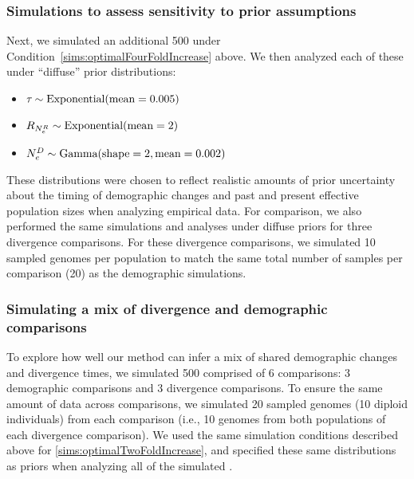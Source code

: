 \subsubsection{Simulations to assess sensitivity to prior assumptions}


Next, we simulated an additional 500 \datasets under
Condition~\ref{sims:optimalFourFoldIncrease} above.
We then analyzed each of these \datasets under ``diffuse'' prior
distributions:
\begin{itemize}
    \item $\etime \sim \dexponential{0.005}$
    \item $\rootrelativepopsize \sim \dexponential{2}$
    \item $\epopsize[\descendantpopindex{}] \sim \dgamma{2}{0.002}$
\end{itemize}
These distributions were chosen to reflect realistic amounts of prior
uncertainty about the timing of demographic changes and past and present
effective population sizes when analyzing empirical data.
For comparison, we also performed the same simulations and analyses under
diffuse priors for three divergence comparisons.
For these divergence comparisons, we simulated 10 sampled genomes per
population to match the same total number of samples per comparison (20) as the
demographic simulations.


\subsubsection{Simulating a mix of divergence and demographic comparisons}

To explore how well our method can infer a mix of shared demographic changes
and divergence times, we simulated 500 \datasets comprised of 6 comparisons:
3 demographic comparisons and
3 divergence comparisons.
To ensure the same amount of data across comparisons, we simulated
20 sampled genomes (10 diploid individuals) from each comparison
(i.e., 10 genomes from both populations of each divergence comparison).
We used the same simulation conditions described above for
\ref{sims:optimalTwoFoldIncrease},
and specified these same distributions as priors when analyzing all of the
simulated \datasets.


